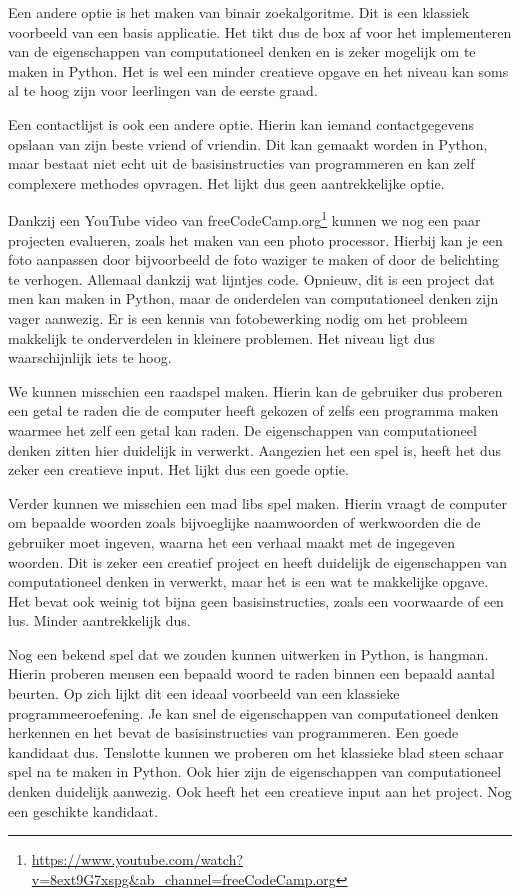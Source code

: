 Een andere optie is het maken van binair zoekalgoritme. Dit is een klassiek voorbeeld van een basis applicatie. Het tikt dus de box af voor het implementeren van de eigenschappen van computationeel denken en is zeker mogelijk om te maken in Python. Het is wel een minder creatieve opgave en het niveau kan soms al te hoog zijn voor leerlingen van de eerste graad.

Een contactlijst is ook een andere optie. Hierin kan iemand contactgegevens opslaan van zijn beste vriend of vriendin. Dit kan gemaakt worden in Python, maar bestaat niet echt uit de basisinstructies van programmeren en kan zelf complexere methodes opvragen. Het lijkt dus geen aantrekkelijke optie.

Dankzij een YouTube video van freeCodeCamp.org\footnote{\url{https://www.youtube.com/watch?v=8ext9G7xspg&ab_channel=freeCodeCamp.org}} kunnen we nog een paar projecten evalueren, zoals het maken van een photo processor. Hierbij kan je een foto aanpassen door bijvoorbeeld de foto waziger te maken of door de belichting te verhogen. Allemaal dankzij wat lijntjes code. Opnieuw, dit is een project dat men kan maken in Python, maar de onderdelen van computationeel denken zijn vager aanwezig. Er is een kennis van fotobewerking nodig om het probleem makkelijk te onderverdelen in kleinere problemen. Het niveau ligt dus waarschijnlijk iets te hoog.

We kunnen misschien een raadspel maken. Hierin kan de gebruiker dus proberen een getal te raden die de computer heeft gekozen of zelfs een programma maken waarmee het zelf een getal kan raden. De eigenschappen van computationeel denken zitten hier duidelijk in verwerkt. Aangezien het een spel is, heeft het dus zeker een creatieve input. Het lijkt dus een goede optie.

Verder kunnen we misschien een mad libs spel maken. Hierin vraagt de computer om bepaalde woorden zoals bijvoeglijke naamwoorden of werkwoorden die de gebruiker moet ingeven, waarna het een verhaal maakt met de ingegeven woorden. Dit is zeker een creatief project en heeft duidelijk de eigenschappen van computationeel denken in verwerkt, maar het is een wat te makkelijke opgave. Het bevat ook weinig tot bijna geen basisinstructies, zoals een voorwaarde of een lus. Minder aantrekkelijk dus.

Nog een bekend spel dat we zouden kunnen uitwerken in Python, is hangman. Hierin proberen mensen een bepaald woord te raden binnen een bepaald aantal beurten. Op zich lijkt dit een ideaal voorbeeld van een klassieke programmeeroefening. Je kan snel de eigenschappen van computationeel denken herkennen en het bevat de basisinstructies van programmeren. Een goede kandidaat dus.
Tenslotte kunnen we proberen om het klassieke blad steen schaar spel na te maken in Python. Ook hier zijn de eigenschappen van computationeel denken duidelijk aanwezig. Ook heeft het een creatieve input aan het project. Nog een geschikte kandidaat.

